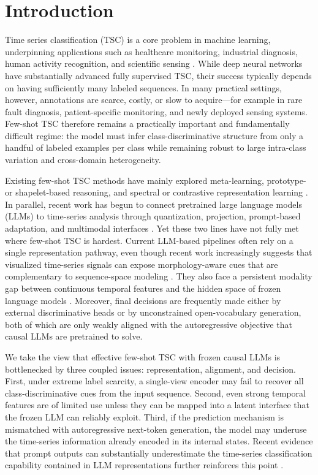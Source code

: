 \documentclass[lettersize,journal]{IEEEtran}
\begin{document}
\section{Introduction}
Time series classification (TSC) is a core problem in machine learning, underpinning applications such as healthcare monitoring, industrial diagnosis, human activity recognition, and scientific sensing \cite{ismail2019deep}. While deep neural networks have substantially advanced fully supervised TSC, their success typically depends on having sufficiently many labeled sequences\cite{pan2024review}. In many practical settings, however, annotations are scarce, costly, or slow to acquire—for example in rare fault diagnosis, patient-specific monitoring, and newly deployed sensing systems. Few-shot TSC therefore remains a practically important and fundamentally difficult regime: the model must infer class-discriminative structure from only a handful of labeled examples per class while remaining robust to large intra-class variation and cross-domain heterogeneity\cite{tang2020interpretable}.

Existing few-shot TSC methods have mainly explored meta-learning, prototype- or shapelet-based reasoning, and spectral or contrastive representation learning \cite{barreda2024cosco,tang2020interpretable,yang2022spectral}. In parallel, recent work has begun to connect pretrained large language models (LLMs) to time-series analysis through quantization, projection, prompt-based adaptation, and multimodal interfaces \cite{zhang2024large,jin2024time,cheng2024advancing}. Yet these two lines have not fully met where few-shot TSC is hardest. Current LLM-based pipelines often rely on a single representation pathway, even though recent work increasingly suggests that visualized time-series signals can expose morphology-aware cues that are complementary to sequence-space modeling \cite{ni2025harnessing,liu2025picture}. They also face a persistent modality gap between continuous temporal features and the hidden space of frozen language models \cite{chang2025llm4ts,cheng2024advancing}. Moreover, final decisions are frequently made either by external discriminative heads or by unconstrained open-vocabulary generation, both of which are only weakly aligned with the autoregressive objective that causal LLMs are pretrained to solve.

We take the view that effective few-shot TSC with frozen causal LLMs is bottlenecked by three coupled issues: representation, alignment, and decision. First, under extreme label scarcity, a single-view encoder may fail to recover all class-discriminative cues from the input sequence. Second, even strong temporal features are of limited use unless they can be mapped into a latent interface that the frozen LLM can reliably exploit. Third, if the prediction mechanism is mismatched with autoregressive next-token generation, the model may underuse the time-series information already encoded in its internal states. Recent evidence that prompt outputs can substantially underestimate the time-series classification capability contained in LLM representations further reinforces this point \cite{schumacher2026prompting}.
\end{document}
